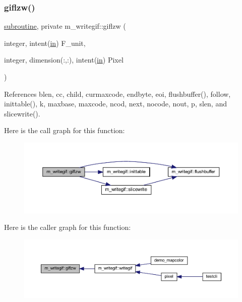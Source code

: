 \subsubsection{\texorpdfstring{giflzw()}{giflzw()}}
{\footnotesize\ttfamily \hyperlink{M__stopwatch_83_8txt_acfbcff50169d691ff02d4a123ed70482}{subroutine}, private m\+\_\+writegif\+::giflzw (\begin{DoxyParamCaption}\item[{integer, intent(\hyperlink{M__journal_83_8txt_afce72651d1eed785a2132bee863b2f38}{in})}]{F\+\_\+unit,  }\item[{integer, dimension(\+:,\+:), intent(\hyperlink{M__journal_83_8txt_afce72651d1eed785a2132bee863b2f38}{in})}]{Pixel }\end{DoxyParamCaption})\hspace{0.3cm}{\ttfamily [private]}}



References blen, cc, child, curmaxcode, endbyte, eoi, flushbuffer(), follow, inittable(), k, maxbase, maxcode, ncod, next, nocode, nout, p, slen, and slicewrite().

Here is the call graph for this function\+:
\nopagebreak
\begin{figure}[H]
\begin{center}
\leavevmode
\includegraphics[width=350pt]{namespacem__writegif_a13c09be69495f4ba21ecb7c134216a17_cgraph}
\end{center}
\end{figure}
Here is the caller graph for this function\+:
\nopagebreak
\begin{figure}[H]
\begin{center}
\leavevmode
\includegraphics[width=350pt]{namespacem__writegif_a13c09be69495f4ba21ecb7c134216a17_icgraph}
\end{center}
\end{figure}
\mbox{\label{namespacem__writegif_aed61b15f90188ddf39b71aa0c73a82a8}} 

